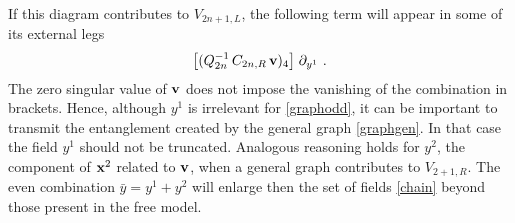 \documentclass[a4paper,preprintnumbers,nofootinbib,twocolumn]{quantumarticle}
\newcommand{\be}{\begin{equation}} \newcommand{\ee}{\end{equation}}
\begin{document}
\noindent If this diagram contributes to $V_{2n+1,L}$,  
the following term will appear in some of its external legs
\be
\big[( Q_{2n}^{-1} \, C_{2n,R} \, {\bf v} )_4\big] \; \partial_{y^1} \ .
\ee
The zero singular value of ${\bf v}$ does not impose the vanishing of the combination in brackets. Hence, although $y^1$ is irrelevant for \eqref{graphodd}, it can be important to transmit the entanglement created by the general graph \eqref{graphgen}. In that case the field $y^1$ should not be truncated. Analogous reasoning holds for $y^2$, the component of ${\bf x}^2$ related to ${\bf v}$, when a general graph contributes to $V_{2+1,R}$. The even combination ${\bar y}=y^1+y^2$ will enlarge then the set of fields \eqref{chain} beyond those present in the free model. 
\end{document}
